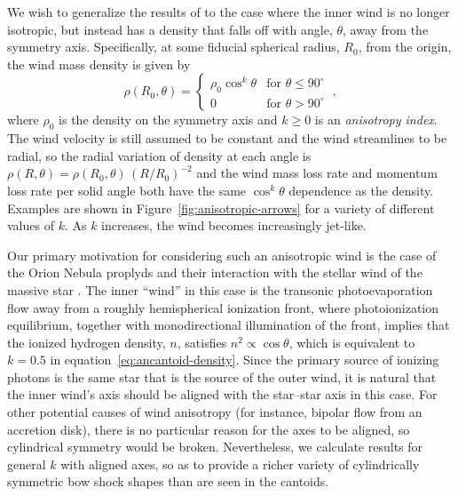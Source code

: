 We wish to generalize the results of \citet[\CRW{}]{Canto:1996} to the
case where the inner wind is no longer isotropic, but instead has a
density that falls off with angle, \(\theta\), away from the symmetry axis.
Specifically, at some fiducial spherical radius, \(R_0\), from the
origin, the wind mass density is given by
\begin{equation}
  \label{eq:ancantoid-density}
  \rho(R_0, \theta) =
  \begin{cases}
    \rho_0 \cos^k \theta & \text{for \(\theta \le 90^\circ\)} \\
    0 & \text{for \(\theta > 90^\circ\)}
  \end{cases}
  \ ,
\end{equation}
where \(\rho_0\) is the density on the symmetry axis and \(k \ge 0\) is an
\textit{anisotropy index}.  The wind velocity is still assumed to be
constant and the wind streamlines to be radial, so the radial
variation of density at each angle is
\(\rho(R, \theta) = \rho(R_0, \theta)\, (R/R_0)^{-2}\) and the wind mass loss rate and
momentum loss rate per solid angle both have the same \(\cos^k\theta\)
dependence as the density.  Examples are shown in
Figure~\ref{fig:anisotropic-arrows} for a variety of different values
of \(k\).  As \(k\) increases, the wind becomes increasingly jet-like.

Our primary motivation for considering such an anisotropic wind is the
case of the Orion Nebula proplyds and their interaction with the
stellar wind of the massive star \thC{}
\citep{Garcia-Arredondo:2001a}.  The inner ``wind'' in this case is
the transonic photoevaporation flow away from a roughly hemispherical
ionization front, where photoionization equilibrium, together with
monodirectional illumination of the front, implies that the ionized
hydrogen density, \(n\), satisfies \(n^2 \propto \cos \theta\), which is
equivalent to \(k = 0.5\) in equation~\eqref{eq:ancantoid-density}.
Since the primary source of ionizing photons is the same star that is
the source of the outer wind, it is natural that the inner wind's axis
should be aligned with the star--star axis in this case.  For other
potential causes of wind anisotropy (for instance, bipolar flow from
an accretion disk), there is no particular reason for the axes to be
aligned, so cylindrical symmetry would be broken.  Nevertheless, we
calculate results for general \(k\) with aligned axes, so as to
provide a richer variety of cylindrically symmetric bow shock shapes
than are seen in the cantoids.

